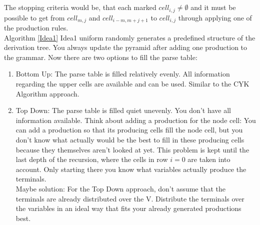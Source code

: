 \noindent
{}
\\
\\
The stopping criteria would be, that each marked $cell_{i,j} \neq \emptyset$ and it must be possible to get from $cell_{m, j}$ and $cell_{i-m, m+j+1}$ to $cell_{i,j}$ through applying one of the production rules.\\
Algorithm \ref{Idea1} Idea1 uniform randomly generates a predefined structure of the derivation tree. You always update the pyramid after adding one production to the grammar. Now there are two options to fill the parse table:
\begin{enumerate}
	\item Bottom Up: The parse table is filled relatively evenly. All information regarding the upper cells are available and can be used. Similar to the CYK Algorithm approach.
	\item Top Down: The parse table is filled quiet unevenly. You don't have all information available. Think about adding a production for the node cell: You can add a production so that its producing cells fill the node cell, but you don't know what actually would be the best to fill in these producing cells because they themselves aren't looked at yet. This problem is kept until the last depth of the recursion, where the cells in row $i=0$ are taken into account. Only starting there you know what variables actually produce the terminals.\\
	Maybe solution: For the Top Down approach, don't assume that the terminals are already distributed over the V. Distribute the terminals over the variables in an ideal way that fits your already generated productions best.
\end{enumerate}

